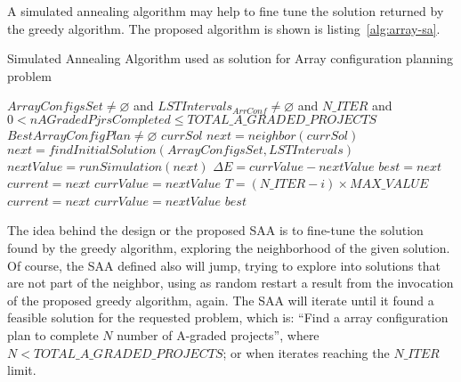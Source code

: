 A simulated annealing algorithm may help to fine tune the solution returned by the greedy algorithm. The proposed algorithm is shown is listing~\ref{alg:array-sa}.
\begin{algorithm}                     
\caption{Simulated Annealing Algorithm used as solution for Array configuration planning problem}          
\label{alg:array-sa}                   
\begin{algorithmic}                    
    \REQUIRE $ArrayConfigsSet \neq \varnothing $ and $LSTIntervals_{ArrConf} \neq \varnothing$ and $N\_ITER$ and $0 < nAGradedPjrsCompleted \leq TOTAL\_A\_GRADED\_PROJECTS$
    \ENSURE $BestArrayConfigPlan \neq \varnothing$
    \REPEAT
    \RETURN $currSol$
    \ENDIF
    \STATE $next = neighbor(currSol)$
    \ELSE
    \STATE $next = findInitialSolution(ArrayConfigsSet, LSTIntervals)$
    \ENDIF
    \STATE $nextValue = runSimulation(next)$
    \STATE $\Delta E = currValue - nextValue$
    \STATE $best = next$
    \STATE $current = next$
    \STATE $currValue =  nextValue$
    \ELSE
    \STATE $T = (N\_ITER - i) \times MAX\_VALUE$
    \STATE $current = next$
    \STATE $currValue =  nextValue$
    \ENDIF
    \ENDIF
    \RETURN $best$
    \end{algorithmic}
\end{algorithm}

The idea behind the design or the proposed SAA is to fine-tune the solution found by the greedy algorithm, exploring the neighborhood of the given solution. Of course, the SAA defined also will jump, trying to explore into solutions that are not part of the neighbor, using as random restart a result from the invocation of the proposed greedy algorithm, again. The SAA will iterate until it found a feasible solution for the requested problem, which is: ``Find a array configuration plan to complete $N$ number of A-graded projects'', where $N < TOTAL\_A\_GRADED\_PROJECTS$; or when iterates reaching the $N\_ITER$ limit.

